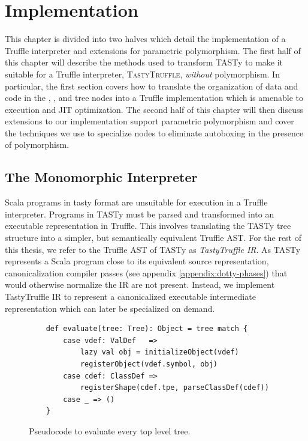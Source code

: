 \chapter{Implementation}
\label{chapter:implementation}

This chapter is divided into two halves which detail the implementation of a Truffle interpreter and extensions for parametric polymorphism.
The first half of this chapter will describe the methods used to transform TASTy to make it suitable for a Truffle interpreter, \textsc{TastyTruffle}, \textit{without} polymorphism.
In particular, the first section covers how to translate the organization of data and code in the , , and  tree nodes into a Truffle implementation which is amenable to execution and JIT optimization.
The second half of this chapter will then discuss extensions to our implementation support parametric polymorphism and cover the techniques we use to specialize nodes to eliminate autoboxing in the presence of polymorphism. 

\section{The Monomorphic Interpreter}
\label{impl:section:monomorphic}

Scala programs in \acrshort{tasty} format are unsuitable for execution in a Truffle interpreter. 
Programs in TASTy must be parsed and transformed into an executable representation in Truffle.
This involves translating the TASTy tree structure into a simpler, but semantically equivalent Truffle AST.
For the rest of this thesis, we refer to the Truffle AST of TASTy as \textit{TastyTruffle IR}.
As TASTy represents a Scala program close to its equivalent source representation, canonicalization compiler passes (see appendix \ref{appendix:dotty-phases}) that would otherwise normalize the IR are not present. 
Instead, we implement TastyTruffle IR to represent a canonicalized executable intermediate representation which can later be specialized on demand. 

\begin{figure}[!htb]
	\begin{verbatim}
	def evaluate(tree: Tree): Object = tree match {
		case vdef: ValDef   => 
			lazy val obj = initializeObject(vdef)
			registerObject(vdef.symbol, obj)			
		case cdef: ClassDef => 
			registerShape(cdef.tpe, parseClassDef(cdef))	
		case _ => ()
	}
	\end{verbatim}
	\caption{Pseudocode to evaluate every top level tree.}
	\label{impl:top-level}
\end{figure}

